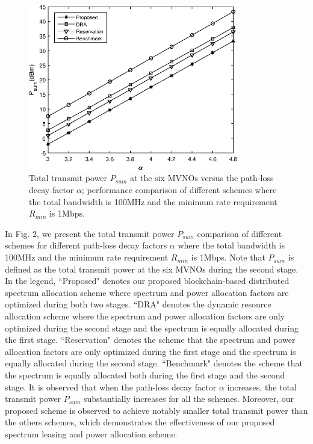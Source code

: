 \documentclass[journal]{IEEEtran}
\begin{document}
\begin{figure}
	\centering
	\includegraphics[width=3.6in]{P_alpha.eps}
	\caption{Total transmit power $P_{sum}$ at the six MVNOs versus the path-loss decay factor $\alpha$; performance comparison of different schemes where the total bandwidth is 100MHz and the minimum rate requirement $R_{min}$ is 1Mbps.}
\end{figure}
In Fig. 2, we present the total transmit power $P_{sum}$ comparison of different schemes for different path-loss decay factors $\alpha$ where the total bandwidth is 100MHz and the minimum rate requirement $R_{min}$ is 1Mbps. Note that $P_{sum}$ is defined as the total transmit power at the six MVNOs during the second stage. In the legend, ``Proposed" denotes our proposed blockchain-based distributed spectrum allocation scheme where spectrum and power allocation factors are optimized during both two stages. ``DRA" denotes the dynamic resource allocation scheme where the spectrum and power allocation factors are only optimized during the second stage and the spectrum is equally allocated during the first stage. ``Reservation" denotes the scheme that the spectrum and power allocation factors are only optimized during the first stage and the spectrum is equally allocated during the second stage. ``Benchmark" denotes the scheme that the spectrum is equally allocated both during the first stage and the second stage. It is observed that when the path-loss decay factor $\alpha$ increases, the total transmit power $P_{sum}$ substantially increases for all the schemes. Moreover, our proposed scheme is observed to achieve notably smaller total transmit power than the others schemes, which demonstrates the effectiveness of our proposed spectrum leasing and power allocation scheme.
\end{document}
